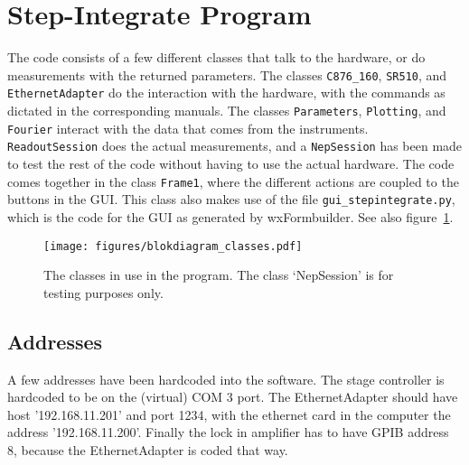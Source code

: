 
\section{Step-Integrate Program}


The code consists of a few different classes that talk to the hardware, or do measurements with the returned parameters. The classes \verb!C876_160!, \verb!SR510!, and \verb!EthernetAdapter! do the interaction with the hardware, with the commands as dictated in the corresponding manuals. The classes \verb!Parameters!, \verb!Plotting!, and \verb!Fourier! interact with the data that comes from the instruments. \verb!ReadoutSession! does the actual measurements, and a \verb!NepSession! has been made to test the rest of the code without having to use the actual hardware. The code comes together in the class \verb!Frame1!, where the different actions are coupled to the buttons in the GUI. This class also makes use of the file \verb!gui_stepintegrate.py!, which is the code for the GUI as generated by wxFormbuilder. See also figure~\ref{fig:blokdiagram}.


\begin{figure}[h!tb]
 \begin{center}
  \texttt{[image: figures/blokdiagram\_classes.pdf]}
  \caption{The classes in use in the program. The class `NepSession' is for testing purposes only.}
  \label{fig:blokdiagram}
 \end{center}
\end{figure}

\subsection{Addresses}
A few addresses have been hardcoded into the software. The stage controller is hardcoded to be on the (virtual) COM 3 port. The EthernetAdapter should have host '192.168.11.201' and port 1234, with the ethernet card in the computer the address '192.168.11.200'. Finally the lock in amplifier has to have GPIB address 8, because the EthernetAdapter is coded that way.

